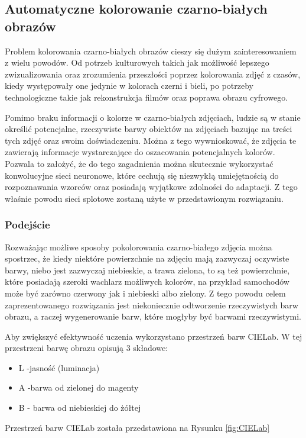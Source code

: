 \subsection{Automatyczne kolorowanie czarno-białych obrazów}

  Problem kolorowania czarno-białych obrazów cieszy się dużym zainteresowaniem z
  wielu powodów. Od potrzeb kulturowych takich jak możliwość lepszego
  zwizualizowania oraz zrozumienia przeszłości poprzez kolorowania zdjęć z
  czasów, kiedy występowały one jedynie w kolorach czerni i bieli, po potrzeby
  technologiczne takie jak rekonstrukcja filmów oraz poprawa obrazu cyfrowego.

  Pomimo braku informacji o kolorze w czarno-białych zdjęciach, ludzie są w
  stanie określić potencjalne, rzeczywiste barwy obiektów na zdjęciach bazując
  na treści tych zdjęć oraz swoim doświadczeniu. Można z tego wywnioskować, że
  zdjęcia te zawierają informacje wystarczające do oszacowania potencjalnych
  kolorów. Pozwala to założyć, że do tego zagadnienia można skutecznie wykorzystać
  konwolucyjne sieci neuronowe, które cechują się niezwykłą umiejętnością do
  rozpoznawania wzorców oraz posiadają wyjątkowe zdolności do adaptacji. Z tego
  właśnie powodu sieci splotowe zostaną użyte w przedstawionym rozwiązaniu.

  \subsubsection{Podejście}

  Rozważając możliwe sposoby pokolorowania czarno-białego zdjęcia można spostrzec,
  że kiedy niektóre powierzchnie na zdjęciu mają zazwyczaj oczywiste barwy, niebo
  jest zazwyczaj niebieskie, a trawa zielona, to są też powierzchnie, które
  posiadają szeroki wachlarz możliwych kolorów, na przykład samochodów może być
  zarówno czerwony jak i niebieski albo zielony. Z tego powodu celem zaprezentowanego
  rozwiązania jest niekoniecznie odtworzenie rzeczywistych barw obrazu, a raczej
  wygenerowanie barw, które mogłyby być barwami rzeczywistymi.

  Aby zwiększyć efektywność uczenia wykorzystano przestrzeń barw CIELab. W tej
  przestrzeni barwę obrazu opisują 3 składowe:
  \begin{itemize}
  \item L -jasność (luminacja)
  \item A -barwa od zielonej do magenty
  \item B - barwa od niebieskiej do żółtej
  \end{itemize}
  Przestrzeń barw CIELab została przedstawiona na Rysunku \ref{fig:CIELab}

